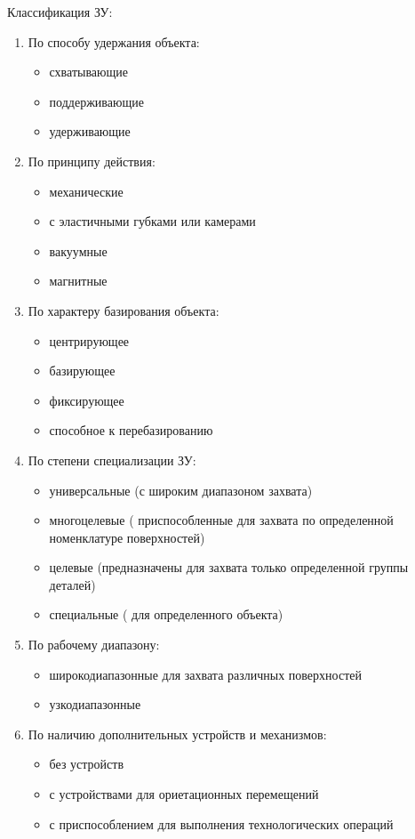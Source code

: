 \documentclass[unicode, 12pt, a4paper, oneside]{article}
\begin{document}
Классификация ЗУ:
\begin{enumerate}
\item	По способу удержания объекта:
\begin{itemize}
\item	схватывающие
\item	поддерживающие
\item	удерживающие
\end{itemize}
\item	По принципу действия:
\begin{itemize}
\item 	механические
\item	с эластичными губками или камерами
\item	вакуумные
\item	магнитные
\end{itemize}
\item	По характеру базирования объекта:
\begin{itemize}
\item	центрирующее
\item	базирующее
\item	фиксирующее
\item	способное к перебазированию
\end{itemize}
\item	По степени специализации ЗУ:
\begin{itemize}
\item	универсальные (с широким диапазоном захвата)
\item	многоцелевые ( приспособленные для захвата по определенной номенклатуре поверхностей)
\item	целевые (предназначены для захвата только определенной группы деталей)
\item	специальные ( для определенного объекта)
\end{itemize}
\item	По рабочему диапазону:
\begin{itemize}
\item	широкодиапазонные для захвата различных поверхностей
\item	узкодиапазонные
\end{itemize}
\item	По наличию дополнительных устройств и механизмов:
\begin{itemize}
\item	без устройств
\item	с устройствами для ориетационных перемещений
\item	с приспособлением для выполнения технологических операций

\end{itemize}
\end{enumerate}
\end{document}
